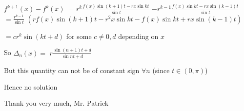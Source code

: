 \begin{solution}
$f^{k+1}(x)-f^{k}(x)$ $=r^{k}\frac{f(x)\sin (k+1)t-rx\sin kt}{\sin t}$ $-r^{k-1}\frac{f(x)\sin kt-rx\sin(k-1)t}{\sin t}$
$=\frac{r^{k-1}}{\sin t}$ $(rf(x)\sin (k+1)t-r^2x\sin kt-f(x)\sin kt+rx\sin(k-1)t)$

$=cr^k\sin(kt+d)$ for some $c\ne 0,d$ depending on $x$

So $\Delta_n(x)=$ $r\frac{\sin (n+1)t+d}{\sin nt+d}$

But this quantity can not be of constant sign $\forall n$ (since $t\in(0,\pi)$)

Hence no solution
\end{solution}



\begin{solution}
	Thank you very much, Mr. Patrick
\end{solution}



